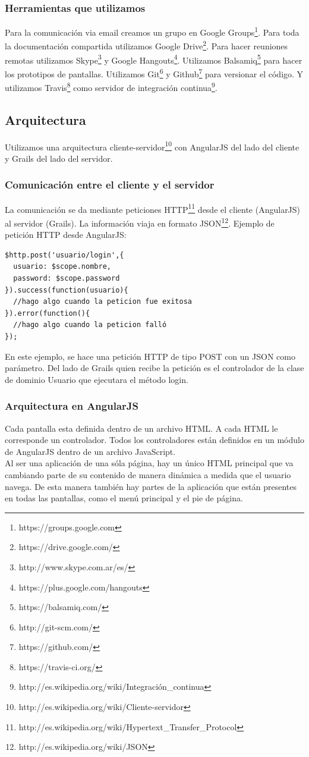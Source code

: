 \subsubsection{Herramientas que utilizamos}
Para la comunicación via email creamos un grupo en Google Groups\footnote{https://groups.google.com}.
Para toda la documentación compartida utilizamos Google Drive\footnote{https://drive.google.com/}. Para hacer reuniones remotas utilizamos Skype\footnote{http://www.skype.com.ar/es/} y Google Hangouts\footnote{https://plus.google.com/hangouts}. Utilizamos Balsamiq\footnote{https://balsamiq.com/} para hacer los prototipos de pantallas. Utilizamos Git\footnote{http://git-scm.com/} y Github\footnote{https://github.com/} para versionar el código. Y utilizamos Travis\footnote{https://travis-ci.org/} como servidor de integración continua\footnote{http://es.wikipedia.org/wiki/Integración\_continua}.
\subsection{Arquitectura}
Utilizamos una arquitectura cliente-servidor\footnote{http://es.wikipedia.org/wiki/Cliente-servidor} con AngularJS del lado del cliente y Grails del lado del servidor. 
\subsubsection{Comunicación entre el cliente y el servidor}
La comunicación se da mediante peticiones HTTP\footnote{http://es.wikipedia.org/wiki/Hypertext\_Transfer\_Protocol} desde el cliente (AngularJS) al servidor (Grails). La información viaja en formato JSON\footnote{http://es.wikipedia.org/wiki/JSON}. Ejemplo de petición HTTP desde AngularJS:\\
\begin{verbatim}
$http.post('usuario/login',{
  usuario: $scope.nombre,
  password: $scope.password
}).success(function(usuario){
  //hago algo cuando la peticion fue exitosa
}).error(function(){
  //hago algo cuando la peticion falló
});		
\end{verbatim}
En este ejemplo, se hace una petición HTTP de tipo POST con un JSON como parámetro. Del lado de Grails quien recibe la petición es el controlador de la clase de dominio Usuario que ejecutara el método login.
\subsubsection{Arquitectura en AngularJS}
Cada pantalla esta definida dentro de un archivo HTML. A cada HTML le corresponde un controlador. Todos los controladores están definidos en un módulo de AngularJS dentro de un archivo JavaScript.\\
Al ser una aplicación de una sóla página, hay un único HTML principal que va cambiando parte de su contenido de manera dinámica a medida que el usuario navega. De esta manera también hay partes de la aplicación que están presentes en todas las pantallas, como el menú principal y el pie de página.
